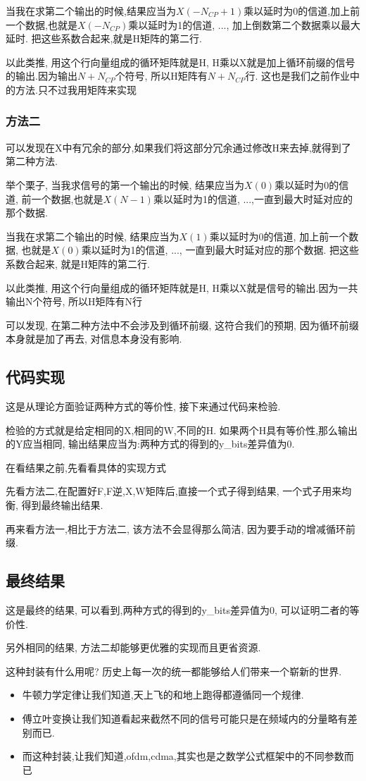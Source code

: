 当我在求第二个输出的时候,结果应当为$X(-N_{CP}+1)$乘以延时为0的信道,加上前一个数据,也就是$X(-N_{CP})$乘以延时为1的信道, ..., 加上倒数第二个数据乘以最大延时.
把这些系数合起来,就是H矩阵的第二行.


以此类推, 用这个行向量组成的循环矩阵就是H, H乘以X就是加上循环前缀的信号的输出.因为输出$N+N_{CP}$个符号, 所以H矩阵有$N+N_{CP}$行.
这也是我们之前作业中的方法.只不过我用矩阵来实现

\subsubsection{方法二}
\indent 可以发现在X中有冗余的部分,如果我们将这部分冗余通过修改H来去掉,就得到了第二种方法.

举个栗子, 当我求信号的第一个输出的时候, 结果应当为$X(0)$乘以延时为0的信道, 前一个数据,也就是$X(N-1)$乘以延时为1的信道, ...,一直到最大时延对应的那个数据.

当我在求第二个输出的时候, 结果应当为$X(1)$乘以延时为0的信道, 加上前一个数据, 也就是$X(0)$乘以延时为1的信道, ..., 一直到最大时延对应的那个数据.
把这些系数合起来, 就是H矩阵的第二行.

以此类推, 用这个行向量组成的循环矩阵就是H, H乘以X就是信号的输出.因为一共输出N个符号, 所以H矩阵有N行

可以发现, 在第二种方法中不会涉及到循环前缀, 这符合我们的预期, 因为循环前缀本身就是加了再去, 对信息本身没有影响.

\subsection{代码实现}
\indent 这是从理论方面验证两种方式的等价性, 接下来通过代码来检验.

检验的方式就是给定相同的X,相同的W,不同的H. 如果两个H具有等价性,那么输出的Y应当相同, 输出结果应当为:两种方式的得到的y\_bits差异值为0.

在看结果之前,先看看具体的实现方式

先看方法二,在配置好F,F逆,X,W矩阵后,直接一个式子得到结果, 一个式子用来均衡, 得到最终输出结果.

再来看方法一,相比于方法二, 该方法不会显得那么简洁, 因为要手动的增减循环前缀.

\subsection{最终结果}
这是最终的结果, 可以看到,两种方式的得到的y\_bits差异值为0, 可以证明二者的等价性.

另外相同的结果, 方法二却能够更优雅的实现而且更省资源.

这种封装有什么用呢?
历史上每一次的统一都能够给人们带来一个崭新的世界.
\begin{itemize}
  \item 牛顿力学定律让我们知道,天上飞的和地上跑得都遵循同一个规律.
  \item 傅立叶变换让我们知道看起来截然不同的信号可能只是在频域内的分量略有差别而已.
  \item 而这种封装,让我们知道,ofdm,cdma,其实也是之数学公式框架中的不同参数而已
\end{itemize}
